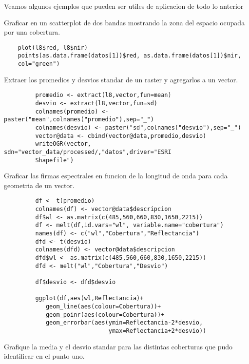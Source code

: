 \documentclass[a4paper]{article}
\begin{document}
 Veamos algunos ejemplos que pueden ser utiles de aplicacion de todo lo anterior

 \begin{exa}
    Graficar en un scatterplot de dos bandas mostrando la zona del espacio 
    ocupada por una cobertura.
 \begin{lstlisting}
    plot(l8$red, l8$nir)
    points(as.data.frame(datos[1])$red, as.data.frame(datos[1])$nir,
    col="green")
 \end{lstlisting}
 \end{exa}

 \begin{exa}
     Extraer los promedios y desvios standar de un raster y agregarlos a un
     vector.
     \begin{lstlisting}
         promedio <- extract(l8,vector,fun=mean)
         desvio <- extract(l8,vector,fun=sd)
         colnames(promedio) <- paster("mean",colnames("promedio"),sep="_")
         colnames(desvio) <- paster("sd",colnames("desvio"),sep="_")
         vector@data <- cbind(vector@data,promedio,desvio)
         writeOGR(vector, sdn="vector_data/processed/,"datos",driver="ESRI
         Shapefile")
     \end{lstlisting}
 \end{exa}

 \begin{exa}
     Graficar las firmas espectrales en funcion de la longitud de onda para cada
     geometria de un vector.
     \begin{lstlisting}
         df <- t(promedio)
         colnames(df) <- vector@data$descripcion
         df$wl <- as.matrix(c(485,560,660,830,1650,2215))
         df <- melt(df,id.vars="wl", variable.name="cobertura")
         names(df) <- c("wl","Cobertura","Reflectancia")
         dfd <- t(desvio)
         colnames(dfd) <- vector@data$descripcion
         dfd$wl <- as.matrix(c(485,560,660,830,1650,2215))
         dfd <- melt("wl","Cobertura","Desvio")

         df$desvio <- dfd$desvio

         ggplot(df,aes(wl,Reflectancia)+
            geom_line(aes(colour=Cobertura))+
            geom_poinr(aes(colour=Cobertura))+
            geom_errorbar(aes(ymin=Reflectancia-2*desvio,
                              ymax=Reflectancia+2*desvio))
     \end{lstlisting}
 \end{exa}

 \begin{act}
    Grafique la media y el desvio standar para las distintas coberturas que pudo
     identificar en el punto uno. 
 \end{act}
\end{document}
